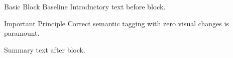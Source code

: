 \documentclass[14pt,t]{beamer}
\begin{document}
\begin{frame}{Basic Block Baseline}
Introductory text before block.

\begin{block}{Important Principle}
Correct semantic tagging with zero visual changes is paramount.
\end{block}

Summary text after block.
\end{frame}
\end{document}

